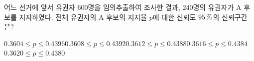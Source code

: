 어느 선거에 앞서 유권자 $600$명을 임의추출하여 조사한 결과, $240$명의 유권자가 A 후보를 지지하였다. 전체 유권자의 A 후보의 지지율 $p$에 대한 신뢰도 $95\mkern3mu \%$의 신뢰구간은? 
\begin{choicesii}{$0.3604\le p\le 0.4396$}{$0.3608\le p\le 0.4392$}{$0.3612\le p\le 0.4388$}{$0.3616\le p\le 0.4384$}{$0.3620\le p\le 0.4380$}\end{choicesii}
